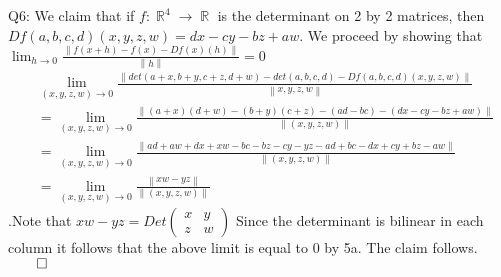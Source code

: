 \documentclass[letterpaper]{article}
\DeclareMathOperator{\R}{\mathbb{R}}
\newcommand{\norm}[1]{\left\lVert#1\right\rVert}
\begin{document}
Q6: We claim that if $f:\R^4 \rightarrow \R$ is the determinant on 2 by 2 matrices, then $Df(a,b,c,d)(x,y,z,w) = dx-cy-bz+aw$.
 We proceed by showing that $\lim_{h \rightarrow 0 } \frac{\norm{f(x+h)-f(x) - Df(x)(h)}}{\norm{h}} = 0$
\begin{align*}
    & \lim_{(x,y,z,w) \rightarrow 0} \frac{\norm{det(a+x,b+y,c+z,d+w) - det(a,b,c,d) - Df(a,b,c,d)(x,y,z,w)}}{\norm{x,y,z,w}}
    \\ & = \lim_{(x,y,z,w) \rightarrow 0 } \frac{\norm{(a+x)(d+w)-(b+y)(c+z)- (ad-bc)- (dx-cy-bz+aw)}}{\norm{(x,y,z,w)}}
    \\ & = \lim_{(x,y,z,w)\rightarrow 0} \frac{\norm{ad+aw+dx+xw-bc-bz-cy-yz-ad+bc - dx + cy + bz - aw}}{\norm{(x,y,z,w)}}
    \\ & = \lim_{(x,y,z,w) \rightarrow 0 } \frac{\norm{xw - yz}}{\norm{(x,y,z,w)}}
\end{align*}.Note that $xw-yz = Det \begin{pmatrix} x & y \\ z & w \end{pmatrix}
    $ Since the determinant is bilinear in each column it follows that the above limit is equal to 0 by 5a. 
The claim follows. $\qed$
\end{document}
